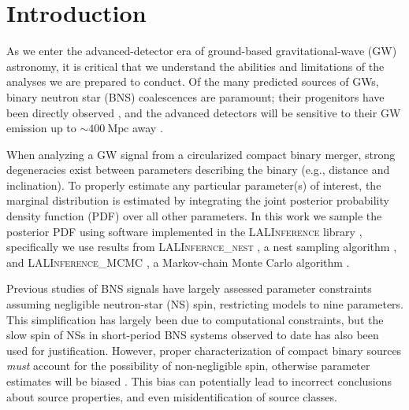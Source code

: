 \section{Introduction}

As we enter the advanced-detector era of ground-based gravitational-wave (GW) astronomy, it is critical that we understand the abilities and limitations of the analyses we are prepared to conduct. Of the many predicted sources of GWs, binary neutron star (BNS) coalescences are paramount; their progenitors have been directly observed \cite{Lorimer_2008}, and the advanced detectors will be sensitive to their GW emission up to $\sim 400~\mathrm{Mpc}$ away \citep{2013arXiv1304.0670L}.

When analyzing a GW signal from a circularized compact binary merger, strong degeneracies exist between parameters describing the binary (e.g., distance and inclination). To properly estimate any particular parameter(s) of interest, the marginal distribution is estimated by integrating the joint posterior probability density function (PDF) over all other parameters. In this work we sample the posterior PDF using software implemented in the \textsc{LALInference} library \citep{Veitch_2014}, specifically we use results from \textsc{LALInfernce\_nest} \linebreak \citep{Veitch_2010}, a nest sampling algorithm \citep{Skilling2006}, and \textsc{LALInference\_MCMC} \citep{Christensen_2003,R_ver_2006,van_der_Sluys_2008}, a Markov-chain Monte Carlo algorithm \citep[chapter 12]{Gregory2005}.

Previous studies of BNS signals have largely assessed parameter constraints assuming negligible neutron-star (NS) spin, restricting models to nine parameters. This simplification has largely been due to computational constraints, but the slow spin of NSs in short-period BNS systems observed to date \citep[e.g.,][]{Mandel_2010} has also been used for justification. However, proper characterization of compact binary sources \textit{must} account for the possibility of non-negligible spin, otherwise parameter estimates will be biased \citep{Buonanno_2009,Berry_2014}.  This bias can potentially lead to incorrect conclusions about source properties, and even misidentification of source classes.

